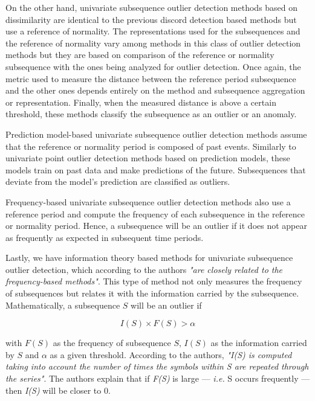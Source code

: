 On the other hand, univariate subsequence outlier detection methods based on dissimilarity are identical to the previous discord detection based methods but use a reference of normality. The representations used for the subsequences and the reference of normality vary among methods in this class of outlier detection methods but they are based on comparison of the reference or normality subsequence with the ones being analyzed for outlier detection. Once again, the metric used to measure the distance between the reference period subsequence and the other ones depends entirely on the method and subsequence aggregation or representation. Finally, when the measured distance is above a certain threshold, these methods classify the subsequence as an outlier or an anomaly.

Prediction model-based univariate subsequence outlier detection methods assume that the reference or normality period is composed of past events. Similarly to univariate point outlier detection methods based on prediction models, these models train on past data and make predictions of the future. Subsequences that deviate from the model's prediction are classified as outliers.

Frequency-based univariate subsequence outlier detection methods also use a reference period and compute the frequency of each subsequence in the reference or normality period. Hence, a subsequence will be an outlier if it does not appear as frequently as expected in subsequent time periods.

Lastly, we have information theory based methods for univariate subsequence outlier detection, which according to the authors \textit{"are closely related to the frequency-based methods"}. This type of method not only measures the frequency of subsequences but relates it with the information carried by the subsequence. Mathematically, a subsequence $S$ will be an outlier if

\begin{equation*}
    I(S) \times F(S) > \alpha
\end{equation*}

with $F(S)$ as the frequency of subsequence $S$, $I(S)$ as the information carried by $S$ and $\alpha$ as a given threshold. According to the authors, \textit{"I(S) is computed taking into account the number of times the symbols within S are repeated through the series"}. The authors explain that if \textit{F(S)} is large --- \textit{i.e.} S occurs frequently --- then \textit{I(S)} will be closer to 0.

